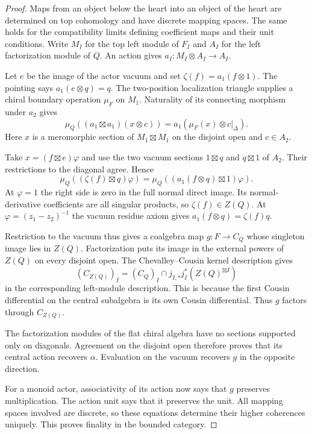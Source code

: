 \begin{proof}
Maps from an object below the heart into an object of the
heart are determined on top cohomology and have discrete
mapping spaces. The same holds for the compatibility
limits defining coefficient maps and their unit
conditions. Write $M_I$ for the top left module of $F_I$
and $A_I$ for the left factorization module of $Q$.
An action gives $a_I:M_I\otimes A_I\to A_I$.

Let $e$ be the image of the actor vacuum and set
$\zeta(f)=a_1(f\otimes1)$. The pointing says
$a_1(e\otimes q)=q$. The two-position localization
triangle supplies a chiral boundary operation $\mu_F$
on $M_1$. Naturality of its connecting morphism under
$a_2$ gives
\[
 \mu_Q((a_1\boxtimes a_1)(x\otimes c))
                 =a_1(\mu_F(x)\otimes c|_\Delta).
\]
Here $x$ is a meromorphic section of $M_1\boxtimes M_1$
on the disjoint open and $c\in A_2$.

Take $x=(f\boxtimes e)\varphi$ and use the two vacuum
sections $1\boxtimes q$ and $q\boxtimes1$ of $A_2$.
Their restrictions to the diagonal agree. Hence
\[
 \mu_Q((\zeta(f)\boxtimes q)\varphi)
 =\mu_Q((a_1(f\otimes q)\boxtimes1)\varphi).
\]
At $\varphi=1$ the right side is zero in the full normal
direct image. Its normal-derivative coefficients are all
singular products, so $\zeta(f)\in Z(Q)$.
At $\varphi=(z_1-z_2)^{-1}$ the
vacuum residue axiom gives
$a_1(f\otimes q)=\zeta(f)q$.

Restriction to the vacuum thus gives a coalgebra map
$g:F\to C_Q$ whose singleton image lies in $Z(Q)$.
Factorization puts its image in the external powers of
$Z(Q)$ on every disjoint open. The Chevalley--Cousin
kernel description gives
\[
 (C_{Z(Q)})_I
   =(C_Q)_I\cap j_{I,*}j_I^*(Z(Q)^{\boxtimes I})
\]
in the corresponding left-module description. This is
because the first Cousin differential on the central
subalgebra is its own Cousin differential. Thus $g$
factors through $C_{Z(Q)}$. 

The factorization modules
of the flat chiral algebra have no sections supported
only on diagonals. Agreement on the disjoint open
therefore proves that its central action recovers
$\alpha$. Evaluation on the vacuum recovers $g$ in
the opposite direction.

For a monoid actor, associativity of its action now says
that $g$ preserves multiplication. The action unit says
that it preserves the unit. All mapping spaces involved
are discrete, so these equations determine their higher
coherences uniquely. This proves finality in the
bounded category.
\end{proof}

